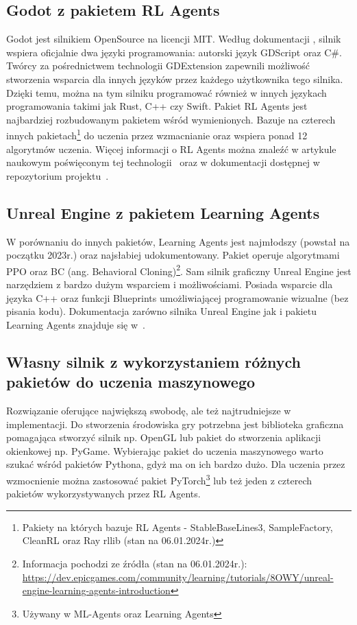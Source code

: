 \documentclass{SGGW-thesis}
\begin{document}
\subsection{Godot z pakietem RL Agents}
Godot jest silnikiem OpenSource na licencji MIT. Według dokumentacji \cite{GodotDocs}, silnik wspiera oficjalnie dwa języki programowania: autorski język GDScript oraz C\#. Twórcy za pośrednictwem technologii GDExtension zapewnili możliwość stworzenia wsparcia dla innych języków przez każdego użytkownika tego silnika.
Dzięki temu, można na tym silniku programować również w innych językach programowania takimi jak Rust, C++ czy Swift. Pakiet RL Agents jest najbardziej rozbudowanym pakietem wśród wymienionych.
Bazuje na czterech innych pakietach\footnote{Pakiety na których bazuje RL Agents - StableBaseLines3, SampleFactory, CleanRL oraz Ray rllib (stan na 06.01.2024r.)} do uczenia przez wzmacnianie
oraz wspiera ponad 12 algorytmów uczenia. Więcej informacji o RL Agents można znaleźć w artykule naukowym poświęconym tej technologii~\cite{GodotRLAgentsArticle} oraz w dokumentacji dostępnej w repozytorium projektu~\cite{GodotRLAgentsDocs}.
\subsection{Unreal Engine z pakietem Learning Agents}
W porównaniu do innych pakietów, Learning Agents jest najmłodszy (powstał na początku 2023r.) oraz najsłabiej udokumentowany. Pakiet operuje algorytmami PPO oraz BC (ang. Behavioral Cloning)\footnote{Informacja pochodzi ze źródła (stan na 06.01.2024r.): \url{https://dev.epicgames.com/community/learning/tutorials/8OWY/unreal-engine-learning-agents-introduction}}. 
Sam silnik graficzny Unreal Engine jest narzędziem z bardzo dużym wsparciem i możliwościami. Posiada wsparcie dla języka C++ oraz funkcji Blueprints umożliwiającej programowanie wizualne (bez pisania kodu). 
Dokumentacja zarówno silnika Unreal Engine jak i pakietu Learning Agents znajduje się w~\cite{UnrealDocs}.
\subsection{Własny silnik z wykorzystaniem różnych pakietów do uczenia maszynowego}
Rozwiązanie oferujące największą swobodę, ale też najtrudniejsze w implementacji. Do stworzenia środowiska gry potrzebna jest biblioteka graficzna pomagająca stworzyć silnik np. OpenGL
lub pakiet do stworzenia aplikacji okienkowej np. PyGame. Wybierając pakiet do uczenia maszynowego warto szukać wśród pakietów Pythona, gdyż ma on ich bardzo dużo. Dla uczenia przez wzmocnienie można zastosować pakiet PyTorch\footnote{Używany w ML-Agents oraz Learning Agents}
lub też jeden z czterech pakietów wykorzystywanych przez RL Agents.
\end{document}
